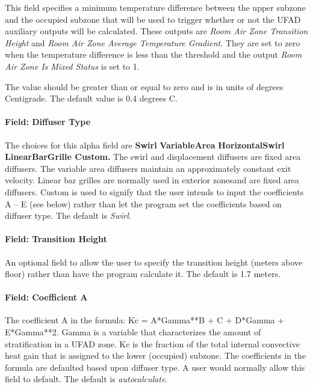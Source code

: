 This field specifies a minimum temperature difference between the upper subzone and the occupied subzone that will be used to trigger whether or not the UFAD auxiliary outputs will be calculated. These outputs are \emph{Room Air Zone Transition Height} and \emph{Room Air Zone Average Temperature Gradient}. They are set to zero when the temperature difference is less than the threshold and the output \emph{Room Air Zone Is Mixed Status} is set to 1.

The value should be greater than or equal to zero and is in units of degrees Centigrade. The default value is 0.4 degrees C.

\paragraph{Field: Diffuser Type}\label{field-diffuser-type}

The choices for this alpha field are \textbf{Swirl} \textbar{} \textbf{VariableArea} \textbar{} \textbf{HorizontalSwirl \textbar{} LinearBarGrille \textbar{} Custom.} The swirl and displacement diffusers are fixed area diffusers. The variable area diffusers maintain an approximately constant exit velocity. Linear bar grilles are normally used in exterior zonesand are fixed area diffusers. Custom is used to signify that the user intends to input the coefficients A -- E (see below) rather than let the program set the coefficients based on diffuser type. The default is \emph{Swirl}.

\paragraph{Field: Transition Height}\label{field-transition-height}

An optional field to allow the user to specify the transition height (meters above floor) rather than have the program calculate it. The default is 1.7 meters.

\paragraph{Field: Coefficient A}\label{field-coefficient-a}

The coefficient A in the formula: Kc = A*Gamma**B + C + D*Gamma + E*Gamma**2. Gamma is a variable that characterizes the amount of stratification in a UFAD zone. Kc is the fraction of the total internal convective heat gain that is assigned to the lower (occupied) subzone. The coefficients in the formula are defaulted based upon diffuser type. A user would normally allow this field to default. The default is \emph{autocalculate}.

